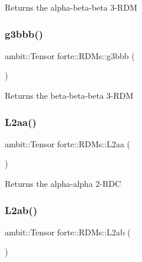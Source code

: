 \begin{DoxyReturn}{Returns}
the alpha-\/beta-\/beta 3-\/\+R\+DM 
\end{DoxyReturn}
\mbox{\label{classforte_1_1_r_d_ms_ad38af9f4dfcf8694d56922ccaf422ade}} 
\subsubsection{\texorpdfstring{g3bbb()}{g3bbb()}}
{\footnotesize\ttfamily ambit\+::\+Tensor forte\+::\+R\+D\+Ms\+::g3bbb (\begin{DoxyParamCaption}{ }\end{DoxyParamCaption})}

\begin{DoxyReturn}{Returns}
the beta-\/beta-\/beta 3-\/\+R\+DM 
\end{DoxyReturn}
\mbox{\label{classforte_1_1_r_d_ms_a415f5e71d89b9a8fcb9b7cb490a49b36}} 
\subsubsection{\texorpdfstring{L2aa()}{L2aa()}}
{\footnotesize\ttfamily ambit\+::\+Tensor forte\+::\+R\+D\+Ms\+::\+L2aa (\begin{DoxyParamCaption}{ }\end{DoxyParamCaption})}

\begin{DoxyReturn}{Returns}
the alpha-\/alpha 2-\/\+R\+DC 
\end{DoxyReturn}
\mbox{\label{classforte_1_1_r_d_ms_a413a6f8fec662a0c8c6801f6354cad91}} 
\subsubsection{\texorpdfstring{L2ab()}{L2ab()}}
{\footnotesize\ttfamily ambit\+::\+Tensor forte\+::\+R\+D\+Ms\+::\+L2ab (\begin{DoxyParamCaption}{ }\end{DoxyParamCaption})}

